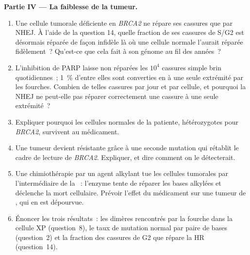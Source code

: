 \begin{problem}
\medskip
\noindent\textbf{Partie IV --- La faiblesse de la tumeur.}
\begin{enumerate}[resume]
  \item Une cellule tumorale déficiente en \emph{BRCA2} ne répare ses
        cassures que par NHEJ. À l'aide de la question 14, quelle
        fraction de ses cassures de S/G2 est désormais réparée de façon
        infidèle là où une cellule normale l'aurait réparée fidèlement~?
        Qu'est-ce que cela fait à son génome au fil des années~?
  \item L'inhibition de PARP laisse non réparées les $10^{4}$ cassures
        simple brin quotidiennes~; \qty{1}{\%} d'entre elles sont
        converties en  à une seule extrémité par
        les fourches. Combien de telles cassures par jour et par
        cellule, et pourquoi la NHEJ ne peut-elle pas réparer
        correctement une cassure à une seule extrémité~?
  \item Expliquer pourquoi les cellules normales de la patiente,
        hétérozygotes pour \emph{BRCA2}, survivent au médicament.
  \item Une tumeur devient résistante grâce à une seconde mutation qui
        rétablit le cadre de lecture de \emph{BRCA2}. Expliquer, et
        dire comment on le détecterait.
  \item Une chimiothérapie par un agent alkylant tue les cellules
        tumorales par l'intermédiaire de la ~: l'enzyme tente de réparer les bases alkylées
        et déclenche la mort cellulaire. Prévoir l'effet du médicament
        sur une tumeur de , qui en est dépourvue.
  \item Énoncer les trois résultats~: les dimères rencontrés par la
        fourche dans la cellule XP (question~8), le taux de mutation
        normal par paire de bases (question~2) et la fraction des
        cassures de G2 que répare la HR (question~14).
\end{enumerate}
\end{problem}
